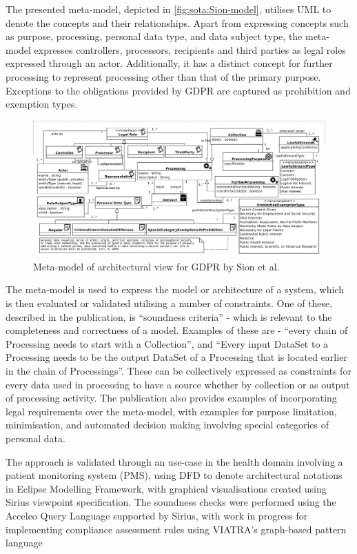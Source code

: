 The presented meta-model, depicted in \autoref{fig:sota:Sion-model}, utilises UML to denote the concepts and their relationships. Apart from expressing concepts such as purpose, processing, personal data type, and data subject type, the meta-model expresses controllers, processors, recipients and third parties as legal roles expressed through an actor. Additionally, it has a distinct concept for further processing to represent processing other than that of the primary purpose. Exceptions to the obligations provided by GDPR are captured as prohibition and exemption types.
\begin{figure}[htbp]
    \centering
    \includegraphics[width=\linewidth]{img/Sion_model.png}
    \caption{Meta-model of architectural view for GDPR by Sion et al. \cite{sion_architectural_2019}}
    \label{fig:sota:Sion-model}
\end{figure}

The meta-model is used to express the model or architecture of a system, which is then evaluated or validated utilising a number of constraints. One of these, described in the publication, is ``soundness criteria'' - which is relevant to the completeness and correctness of a model. Examples of these are - ``every chain of Processing needs to start with a Collection'', and ``Every input DataSet to a Processing needs to be the output DataSet of a Processing that is located earlier in the chain of Processings''. These can be collectively expressed as constraints for every data used in processing to have a source whether by collection or as output of processing activity. The publication also provides examples of incorporating legal requirements over the meta-model, with examples for purpose limitation, minimisation, and automated decision making involving special categories of personal data. 

The approach is validated through an use-case in the health domain involving a patient monitoring system (PMS), using DFD to denote architectural notations in Eclipse Modelling Framework, with graphical visualisations created using Sirius viewpoint specification. The soundness checks were performed using the Acceleo Query Language supported by Sirius, with work in progress for implementing compliance assessment rules using VIATRA’s graph-based pattern language

